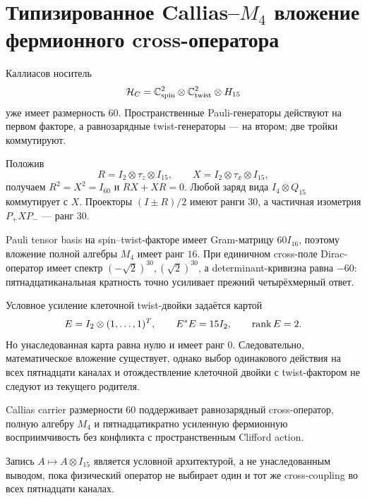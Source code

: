 \chapter{Типизированное Callias--\texorpdfstring{$M_4$}{M4} вложение
фермионного cross-оператора}
\label{ch:v10-callias-m4-cross-embedding}

Каллиасов носитель
\begin{equation}
 \mathcal H_C=\mathbb C^2_{\rm spin}\otimes\mathbb C^2_{\rm twist}\otimes H_{15}
\end{equation}
уже имеет размерность $60$. Пространственные Pauli-генераторы действуют на
первом факторе, а равнозарядные twist-генераторы --- на втором; две
тройки коммутируют.

Положив
\begin{equation}
 R=I_2\otimes\tau_z\otimes I_{15},\qquad
 X=I_2\otimes\tau_x\otimes I_{15},
\end{equation}
получаем $R^2=X^2=I_{60}$ и $RX+XR=0$. Любой заряд вида
$I_4\otimes Q_{15}$ коммутирует с $X$. Проекторы $(I\pm R)/2$ имеют ранги
$30$, а частичная изометрия $P_+XP_-$ --- ранг $30$.

Pauli tensor basis на spin--twist-факторе имеет Gram-матрицу $60I_{16}$,
поэтому вложение полной алгебры $M_4$ имеет ранг $16$. При единичном
cross-поле Dirac-оператор имеет спектр
$(-\sqrt2)^{30},(\sqrt2)^{30}$, а determinant-кривизна равна $-60$:
пятнадцатиканальная кратность точно усиливает прежний четырёхмерный ответ.

Условное усиление клеточной twist-двойки задаётся картой
\begin{equation}
 E=I_2\otimes(1,\ldots,1)^T,\qquad E^*E=15I_2,\qquad \operatorname{rank} E=2.
\end{equation}
Но унаследованная карта равна нулю и имеет ранг $0$. Следовательно,
математическое вложение существует, однако выбор одинакового действия на
всех пятнадцати каналах и отождествление клеточной двойки с twist-фактором
не следуют из текущего родителя.

\begin{theorem}
Callias carrier размерности $60$ поддерживает равнозарядный cross-оператор,
полную алгебру $M_4$ и пятнадцатикратно усиленную фермионную
восприимчивость без конфликта с пространственным Clifford action.
\end{theorem}

\begin{nogocriterion}
Запись $A\mapsto A\otimes I_{15}$ является условной архитектурой, а не
унаследованным выводом, пока физический оператор не выбирает один и тот же
cross-coupling во всех пятнадцати каналах.
\end{nogocriterion}

